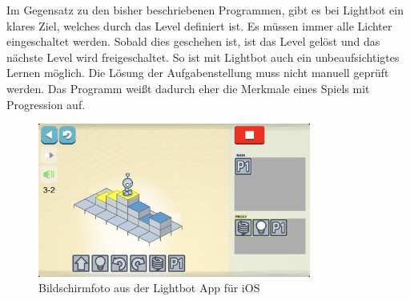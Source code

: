 Im Gegensatz zu den bisher beschriebenen Programmen, gibt es bei Lightbot ein klares Ziel, welches durch das Level definiert ist. Es müssen immer alle Lichter eingeschaltet werden. Sobald dies geschehen ist, ist das Level gelöst und das nächste Level wird freigeschaltet. So ist mit Lightbot auch ein unbeaufsichtigtes Lernen möglich. Die Lösung der Aufgabenstellung muss nicht manuell geprüft werden. Das Programm weißt dadurch eher die Merkmale eines Spiels mit Progression auf.

\begin{figure}
    \centering
    \includegraphics[width=0.8\textwidth]{gfx/related-lightbot-screenshot.png}
    \caption{Bildschirmfoto aus der Lightbot App für iOS}
    \label{fig:related:lightbot:screenshot}
\end{figure}
